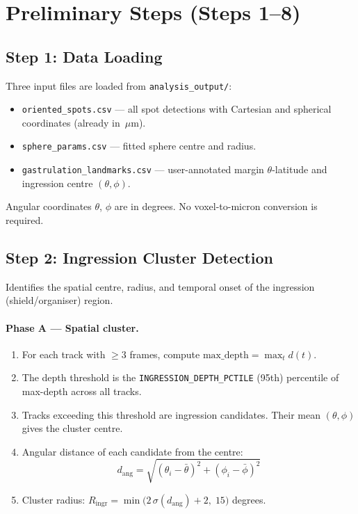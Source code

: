 \documentclass[11pt,a4paper]{article}
\newcommand{\um}{\,\mu\text{m}}
\newcommand{\param}[1]{\texttt{#1}}
\begin{document}
\newpage
\section*{Preliminary Steps (Steps 1--8)}

\subsection*{Step 1: Data Loading}

Three input files are loaded from \texttt{analysis\_output/}:
\begin{itemize}[nosep]
  \item \texttt{oriented\_spots.csv} --- all spot detections with Cartesian
        and spherical coordinates (already in $\um$).
  \item \texttt{sphere\_params.csv} --- fitted sphere centre and radius.
  \item \texttt{gastrulation\_landmarks.csv} --- user-annotated margin
        $\theta$-latitude and ingression centre $(\theta,\phi)$.
\end{itemize}

Angular coordinates $\theta$, $\phi$ are in degrees.  No voxel-to-micron
conversion is required.

\subsection*{Step 2: Ingression Cluster Detection}

Identifies the spatial centre, radius, and temporal onset of the
ingression (shield/organiser) region.

\paragraph{Phase A --- Spatial cluster.}
\begin{enumerate}[nosep]
  \item For each track with $\ge 3$ frames, compute
        $\mathrm{max\_depth} = \max_t d(t)$.
  \item The depth threshold is the \param{INGRESSION\_DEPTH\_PCTILE}
        (95th) percentile of max-depth across all tracks.
  \item Tracks exceeding this threshold are ingression candidates.  Their
        mean $(\theta,\phi)$ gives the cluster centre.
  \item Angular distance of each candidate from the centre:
        \[
          d_\mathrm{ang} = \sqrt{(\theta_i - \bar\theta)^2
                                +(\phi_i - \bar\phi)^2}
        \]
  \item Cluster radius:
        $R_\mathrm{ingr} = \min\!\bigl(2\,\sigma(d_\mathrm{ang})+2,\;15\bigr)$
        degrees.
\end{enumerate}
\end{document}
